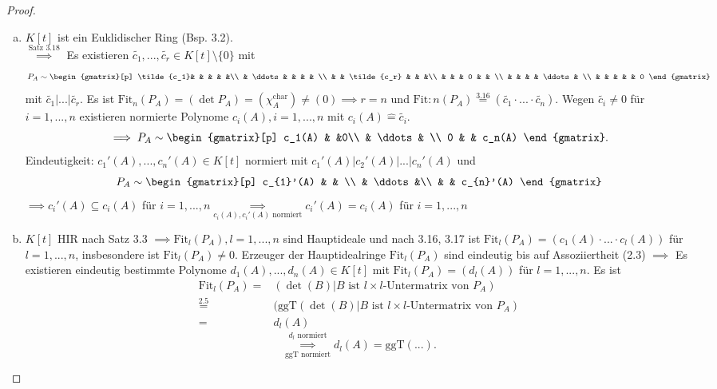 \documentclass[a4paper, titlepage]{article}
\theoremstyle{definition}
\newcommand{\Fit}{\mathrm{Fit}}
\begin{document}
\begin{proof}
    \begin{enumerate}[(a)]
        \item $K[t]$ ist ein Euklidischer Ring (Bsp. 3.2).\\
            $\overset{\text{Satz 3.18}}{\implies}$ Es existieren $\tilde{c_1},...,\tilde{c_r}\in K[t]\setminus \{0\}$ mit 
            $$P_A\sim \begin{gmatrix}[p]
                \tilde{c_1}& & & & &\\
                & \ddots & & & & \\
                & & \tilde{c_r} & & &\\
                & & & 0 & & \\
                & & & & \ddots & \\
                & & & & & 0
            \end{gmatrix}$$ mit $\tilde{c_1}|...|\tilde{c_r}.$ Es ist $\Fit_n(P_A)=(\det P_A)=(\chi_{A}^{\text{char}})\neq (0) \implies r=n$ und $\Fit:n(P_A)\overset{3.16}{=}(\tilde{c_1}\cdot ... \cdot \tilde{c_n}).$ Wegen $\tilde{c_i}\neq 0$ für $i=1,...,n$ existieren normierte Polynome $c_i(A), i=1,...,n$ mit $c_i(A)\widehat{=} \tilde{c_i}.$
            $$\implies P_A\sim \begin{gmatrix}[p]
                c_1(A) & &0\\
            & \ddots & \\
            0 & & c_n(A)
         \end{gmatrix}.$$
         Eindeutigkeit: $c_1'(A),...,c_n'(A)\in K[t]$ normiert mit $c_1'(A)|c_2'(A)|...|c_n'(A)$ und 
        $$ P_A\sim \begin{gmatrix}[p]
            c_{1}'(A) & & \\
            & \ddots &\\
            & & c_{n}'(A)
        \end{gmatrix}$$
  $\implies c_i'(A)\subseteq c_i(A)$ für $i=1,...,n \underset{c_i(A),c_i'(A) \text{ normiert}}{\implies} c_i'(A)=c_i(A)$ für $i=1,...,n$
  \item $K[t]$ HIR nach Satz 3.3 $\implies \Fit_l(P_A), l=1,...,n$ sind Hauptideale und nach 3.16, 3.17 ist $\Fit_l(P_A)=(c_1(A)\cdot ... \cdot c_l(A))$ für $l=1,...,n$, insbesondere ist $\Fit_l(P_A)\neq 0.$ Erzeuger der Hauptidealringe $\Fit_l(P_A)$ sind eindeutig bis auf Assoziiertheit (2.3) $\implies $ Es existieren eindeutig bestimmte Polynome $d_1(A),...,d_n(A)\in K[t]$ mit $\Fit_l(P_A)=(d_l(A))$ für $l=1,...,n.$
    Es ist \begin{align*}
        \Fit_l(P_A)=&(\det(B)|B \text{ ist }l\times l\text{-Untermatrix von }P_A)\\
        \overset{2.5}{=}& (\text{ggT}(\det(B)|B \text{ ist }l\times l\text{-Untermatrix von }P_A )\\
        =& d_l(A)
    \end{align*}
    $$\overset{d_l\text{ normiert}}{\underset{\text{ggT normiert}}{\implies}}d_l(A)=\text{ggT}(...).$$
        \end{enumerate}
    \end{proof}
\end{document}
